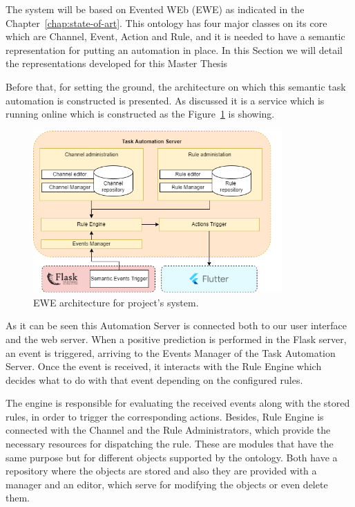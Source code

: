 The system will be based on Evented WEb (EWE) as indicated in the Chapter~\ref{chap:state-of-art}. This ontology has four major classes on its core which are Channel, Event, Action and Rule, and it is needed to have a semantic representation for putting an automation in place. In this Section we will detail the representations developed for this Master Thesis

Before that, for setting the ground, the architecture on which this semantic task automation is constructed is presented. As discussed it is a service which is running online which is constructed as the Figure~\ref{fig:ewearchitecure} is showing.

\begin{figure}[h]
    \centering
    \includegraphics[width=0.85\textwidth]{img/architecture/EWEarchitecture.png}
    \caption{EWE architecture for project's system.}
    \label{fig:ewearchitecure}
\end{figure}

As it can be seen this Automation Server is connected both to our user interface and the web server. When a positive prediction is performed in the Flask server, an event is triggered, arriving to the Events Manager of the Task Automation Server. Once the event is received, it interacts with the Rule Engine which decides what to do with that event depending on the configured rules. 

The engine is responsible for evaluating the received events along with the stored rules, in order to trigger the corresponding actions. Besides, Rule Engine is connected with the Channel and the Rule Administrators, which provide the necessary resources for dispatching the rule. These are modules that have the same purpose but for different objects supported by the ontology. Both have a repository where the objects are stored and also they are provided with a manager and an editor, which serve for modifying the objects or even delete them.

